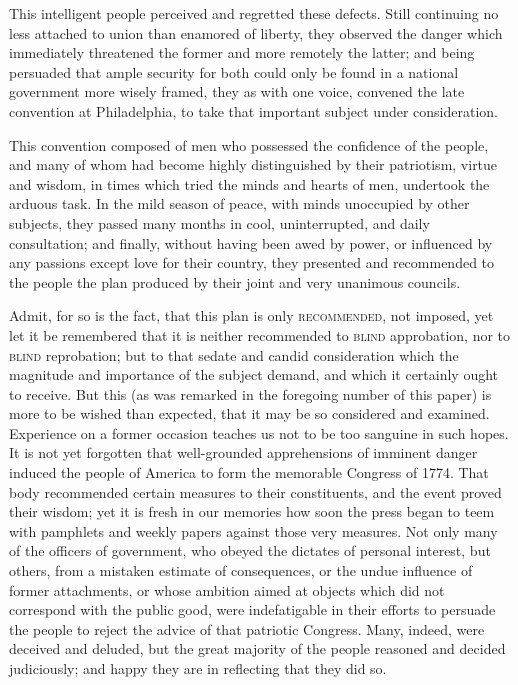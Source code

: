 This intelligent people perceived and regretted these defects. 
Still continuing no less attached to union than enamored of liberty, they observed the danger which immediately threatened the former and more remotely the latter; and being persuaded that ample security for both could only be found in a national government more wisely framed, they as with one voice, convened the late convention at Philadelphia, to take that important subject under consideration.

This convention composed of men who possessed the confidence of the people, and many of whom had become highly distinguished by their patriotism, virtue and wisdom, in times which tried the minds and hearts of men, undertook the arduous task. 
In the mild season of peace, with minds unoccupied by other subjects, they passed many months in cool, uninterrupted, and daily consultation; and finally, without having been awed by power, or influenced by any passions except love for their country, they presented and recommended to the people the plan produced by their joint and very unanimous councils.

Admit, for so is the fact, that this plan is only \textsc{recommended}, not imposed, yet let it be remembered that it is neither recommended to \textsc{blind} approbation, nor to \textsc{blind} reprobation; but to that sedate and candid consideration which the magnitude and importance of the subject demand, and which it certainly ought to receive. 
But this (as was remarked in the foregoing number of this paper) is more to be wished than expected, that it may be so considered and examined. 
Experience on a former occasion teaches us not to be too sanguine in such hopes. 
It is not yet forgotten that well-grounded apprehensions of imminent danger induced the people of America to form the memorable Congress of 1774. 
That body recommended certain measures to their constituents, and the event proved their wisdom; yet it is fresh in our memories how soon the press began to teem with pamphlets and weekly papers against those very measures. 
Not only many of the officers of government, who obeyed the dictates of personal interest, but others, from a mistaken estimate of consequences, or the undue influence of former attachments, or whose ambition aimed at objects which did not correspond with the public good, were indefatigable in their efforts to persuade the people to reject the advice of that patriotic Congress. 
Many, indeed, were deceived and deluded, but the great majority of the people reasoned and decided judiciously; and happy they are in reflecting that they did so.


